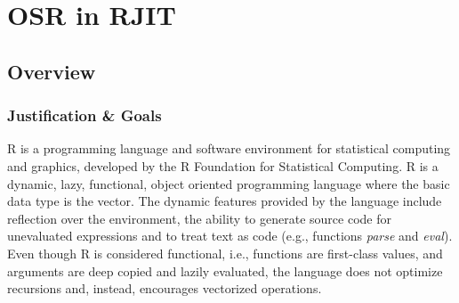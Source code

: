 
\chapter{OSR in RJIT} %

\label{Chapter4New} %


\newcommand{\keyword}[1]{\textbf{#1}}
\newcommand{\tabhead}[1]{\textbf{#1}}
\newcommand{\code}[1]{\texttt{#1}}
\newcommand{\file}[1]{\texttt{\bfseries#1}}
\newcommand{\option}[1]{\texttt{\itshape#1}}

\section{Overview}
\subsection{Justification \& Goals}
            
R is a programming language and software environment for statistical computing and graphics, developed by the R Foundation for Statistical Computing\cite{RURL}.
R is a dynamic, lazy, functional, object oriented programming language where the basic data type is the vector.
The dynamic features provided by the language include reflection over the environment, the ability to generate source code for unevaluated expressions and to treat text as code (e.g., functions \textit{parse} and \textit{eval}).
Even though R is considered functional, i.e., functions are first-class values, and arguments are deep copied and lazily evaluated, the language does not optimize recursions and, instead, encourages vectorized operations.\\

